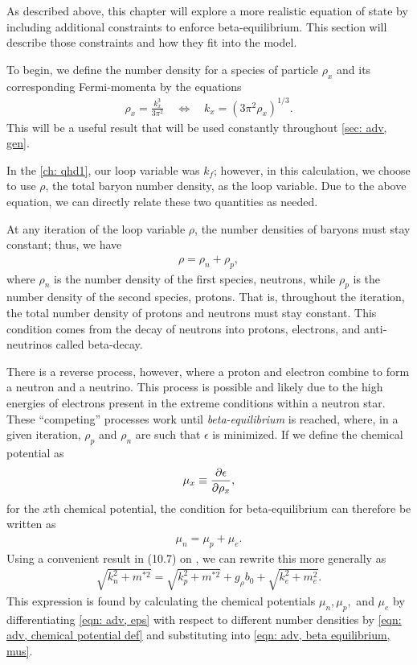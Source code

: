 As described above, this chapter will explore a more realistic equation of state by including additional constraints to enforce beta-equilibrium. This section will describe those constraints and how they fit into the model.

To begin, we define the number density for a species of particle $\rho_x$ and its corresponding Fermi-momenta by the equations
\begin{align}\label{eqn: adv, k to rho}
    \rho_x = \frac{k_x^3}{3\pi^2} \quad\Longleftrightarrow\quad k_x = (3\pi^2\rho_x)^{1/3}.
\end{align}
This will be a useful result that will be used constantly throughout \autoref{sec: adv, gen}.

In the \autoref{ch: qhd1}, our loop variable was $k_f$; however, in this calculation, we choose to use $\rho$, the total baryon number density, as the loop variable. Due to the above equation, we can directly relate these two quantities as needed.

At any iteration of the loop variable $\rho$, the number densities of baryons must stay constant; thus, we have
\begin{align}\label{eqn: adv, conservation of number density}
    \rho = \rho_n + \rho_p,
\end{align}
where $\rho_n$ is the number density of the first species, neutrons, while $\rho_p$ is the number density of the second species, protons. That is, throughout the iteration, the total number density of protons and neutrons must stay constant. This condition comes from the decay of neutrons into protons, electrons, and anti-neutrinos called beta-decay.

There is a reverse process, however, where a proton and electron combine to form a neutron and a neutrino. This process is possible and likely due to the high energies of electrons present in the extreme conditions within a neutron star. These ``competing'' processes work until \textit{beta-equilibrium} is reached, where, in a given iteration, $\rho_p$ and $\rho_n$ are such that $\epsilon$ is minimized. If we define the chemical potential as
\begin{align}\label{eqn: adv, chemical potential def}
    \mu_x \equiv \pdv{\epsilon}{\rho_x}, 
\end{align}
for the $x$th chemical potential, the condition for beta-equilibrium can therefore be written as
\begin{align}\label{eqn: adv, beta equilibrium, mus}
    \mu_n = \mu_p + \mu_e.
\end{align}
Using a convenient result in (10.7) on \autocite[p. 90]{diener_2008}, we can rewrite this more generally as
\begin{align}\label{eqn: adv, beta equilibrium}
    \sqrt{k_n^2 + m^{*2}} = \sqrt{k_p^2 + m^{*2}} + g_\rho b_0 + \sqrt{k_e^2 + m_e^2}.
\end{align}
This expression is found by calculating the chemical potentials $\mu_n, \mu_p,$ and $\mu_e$ by differentiating \eqref{eqn: adv, eps} with respect to different number densities by \eqref{eqn: adv, chemical potential def} and substituting into \eqref{eqn: adv, beta equilibrium, mus}.

